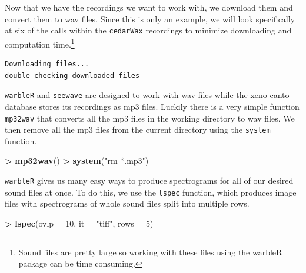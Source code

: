 \documentclass[]{krantz}
\makeatletter
\newenvironment{Shaded}{\begin{snugshade}}{\end{snugshade}}
\newcommand{\KeywordTok}[1]{\textcolor[rgb]{0.27,0.27,0.27}{\textbf{#1}}}
\newcommand{\DataTypeTok}[1]{\textcolor[rgb]{0.27,0.27,0.27}{#1}}
\newcommand{\DecValTok}[1]{\textcolor[rgb]{0.06,0.06,0.06}{#1}}
\newcommand{\StringTok}[1]{\textcolor[rgb]{0.5,0.5,0.5}{#1}}
\newcommand{\OperatorTok}[1]{\textcolor[rgb]{0.43,0.43,0.43}{\textbf{#1}}}
\newcommand{\NormalTok}[1]{#1}
\newenvironment{kframe}{%
\medskip{}
\setlength{\fboxsep}{.8em}
 \def\at@end@of@kframe{}%
 \ifinner\ifhmode%
  \def\at@end@of@kframe{\end{minipage}}%
  \begin{minipage}{\columnwidth}%
 \fi\fi%
 \def\FrameCommand##1{\hskip\@totalleftmargin \hskip-\fboxsep
 \colorbox{shadecolor}{##1}\hskip-\fboxsep
     \hskip-\linewidth \hskip-\@totalleftmargin \hskip\columnwidth}%
 \MakeFramed {\advance\hsize-\width
   \@totalleftmargin\z@ \linewidth\hsize
   \@setminipage}}%
 {\par\unskip\endMakeFramed%
 \at@end@of@kframe}
\renewenvironment{Shaded}{\begin{kframe}}{\end{kframe}}
\makeatother
\begin{document}
Now that we have the recordings we want to work with, we download them
and convert them to wav files. Since this is only an example, we will
look specifically at six of the calls within the \texttt{cedarWax}
recordings to minimize downloading and computation time.\footnote{Sound
  files are pretty large so working with these files using the warbleR
  package can be time consuming.}

\begin{Shaded}
\end{Shaded}

\begin{verbatim}
Downloading files...
double-checking downloaded files
\end{verbatim}

\texttt{warbleR} and \texttt{seewave} are designed to work with wav
files while the xeno-canto database stores its recordings as mp3 files.
Luckily there is a very simple function \texttt{mp32wav} that converts
all the mp3 files in the working directory to wav files. We then remove
all the mp3 files from the current directory using the \texttt{system}
function.

\begin{Shaded}
\begin{Highlighting}[]
\OperatorTok{>}\StringTok{ }\KeywordTok{mp32wav}\NormalTok{()}
\OperatorTok{>}\StringTok{ }\KeywordTok{system}\NormalTok{(}\StringTok{"rm *.mp3"}\NormalTok{)}
\end{Highlighting}
\end{Shaded}

\texttt{warbleR} gives us many easy ways to produce spectrograms for all
of our desired sound files at once. To do this, we use the
\texttt{lspec} function, which produces image files with spectrograms of
whole sound files split into multiple rows.

\begin{Shaded}
\begin{Highlighting}[]
\OperatorTok{>}\StringTok{ }\KeywordTok{lspec}\NormalTok{(}\DataTypeTok{ovlp =} \DecValTok{10}\NormalTok{, }\DataTypeTok{it =} \StringTok{"tiff"}\NormalTok{, }\DataTypeTok{rows =} \DecValTok{5}\NormalTok{)}
\end{Highlighting}
\end{Shaded}
\end{document}
